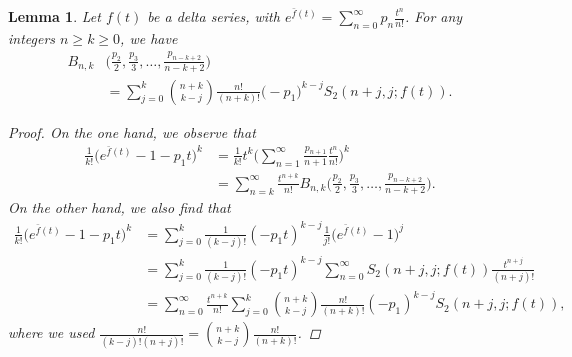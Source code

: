 \documentclass[a4paper,11pt]{amsart}
\newtheorem{lemma}[theorem]{Lemma}
\begin{document}
\begin{lemma}
Let $f(t)$ be a delta series, with $e^{\bar{f}(t)}=\sum_{n=0}^{\infty}p_{n}\frac{t^{n}}{n!}$. For any integers $n \ge k \ge 0$, we have
\begin{align*}
B_{n,k}&\Big(\frac{p_{2}}{2},\frac{p_{3}}{3},\dots,\frac{p_{n-k+2}}{n-k+2}\Big) \\
&=\sum_{j=0}^{k}\binom{n+k}{k-j}\frac{n!}{(n+k)!}\big(-p_{1})^{k-j}S_{2}(n+j,j; f(t)).
\end{align*}
\begin{proof}
On the one hand, we observe that
\begin{align*}
\frac{1}{k!}\Big(e^{\bar{f}(t)}-1-p_{1}t\Big)^{k}&=\frac{1}{k!}t^{k}\Big(\sum_{n=1}^{\infty}\frac{p_{n+1}}{n+1}\frac{t^{n}}{n!}\Big)^{k} \\
&=\sum_{n=k}^{\infty}\frac{t^{n+k}}{n!}B_{n,k}\Big(\frac{p_{2}}{2},\frac{p_{3}}{3},\dots,\frac{p_{n-k+2}}{n-k+2}\Big).
\end{align*}
On the other hand, we also find that
\begin{align*}
\frac{1}{k!}\Big(e^{\bar{f}(t)}-1-p_{1}t\Big)^{k}&=\sum_{j=0}^{k}\frac{1}{(k-j)!}(-p_{1}t)^{k-j}\frac{1}{j!}\big(e^{\bar{f}(t)}-1\big)^{j} \\
&=\sum_{j=0}^{k}\frac{1}{(k-j)!}(-p_{1}t)^{k-j}\sum_{n=0}^{\infty}S_{2}(n+j,j; f(t))\frac{t^{n+j}}{(n+j)!} \\
&=\sum_{n=0}^{\infty}\frac{t^{n+k}}{n!}\sum_{j=0}^{k}\binom{n+k}{k-j}\frac{n!}{(n+k)!}(-p_{1})^{k-j}S_{2}(n+j,j; f(t)),
\end{align*}
where we used $\frac{n!}{(k-j)!(n+j)!}=\binom{n+k}{k-j}\frac{n!}{(n+k)!}$.
\end{proof}
\end{lemma}
\end{document}
